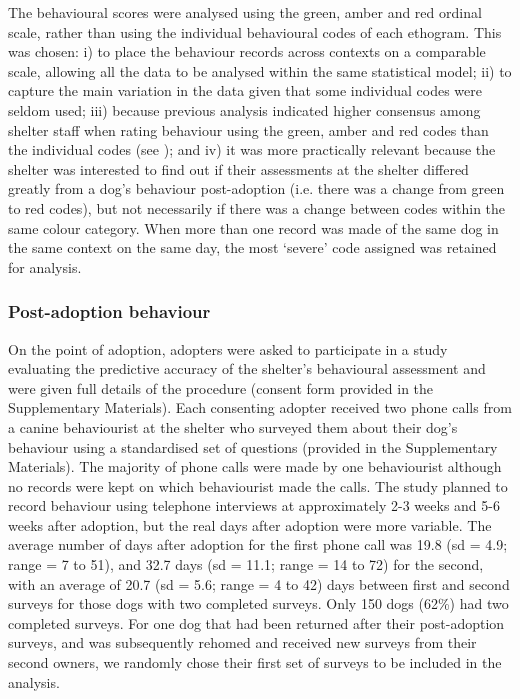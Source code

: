 \documentclass[12pt]{article}
\begin{document}
The behavioural scores were analysed using the green, amber and red ordinal scale, rather than using the individual behavioural codes of each ethogram. This was chosen: i) to place the behaviour records across contexts on a comparable scale, allowing all the data to be analysed within the same statistical model; ii) to capture the main variation in the data given that some individual codes were seldom used; iii) because previous analysis indicated higher consensus among shelter staff when rating behaviour using the green, amber and red codes than the individual codes (see \cite{goold2017modelling}); and iv) it was more practically relevant because the shelter was interested to find out if their assessments at the shelter differed greatly from a dog's behaviour post-adoption (i.e. there was a change from green to red codes), but not necessarily if there was a change between codes within the same colour category. When more than one record was made of the same dog in the same context on the same day, the most `severe' code assigned was retained for analysis.

\subsubsection{Post-adoption behaviour}
On the point of adoption, adopters were asked to participate in a study evaluating the predictive accuracy of the shelter's behavioural assessment and were given full details of the procedure (consent form provided in the Supplementary Materials). Each consenting adopter received two phone calls from a canine behaviourist at the shelter who surveyed them about their dog's behaviour using a standardised set of questions (provided in the Supplementary Materials). The majority of phone calls were made by one behaviourist although no records were kept on which behaviourist made the calls. The study planned to record behaviour using telephone interviews at approximately 2-3 weeks and 5-6 weeks after adoption, but the real days after adoption were more variable. The average number of days after adoption for the first phone call was 19.8 (sd = 4.9; range = 7 to 51), and 32.7 days (sd = 11.1; range = 14 to 72) for the second, with an average of 20.7 (sd = 5.6; range = 4 to 42) days between first and second surveys for those dogs with two completed surveys. Only 150 dogs (62\%) had two completed surveys. For one dog that had been returned after their post-adoption surveys, and was subsequently rehomed and received new surveys from their second owners, we randomly chose their first set of surveys to be included in the analysis.
\end{document}
